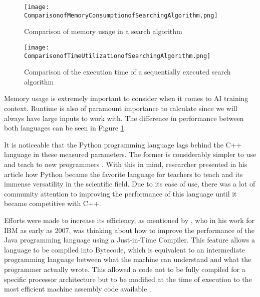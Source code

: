 \begin{figure}[htb]
    \centering
    \begin{minipage}{0.45\linewidth}
        \centering
        \texttt{[image: ComparisonofMemoryConsumptionofSearchingAlgorithm.png]}
        \caption{Comparison of memory usage in a search algorithm\protect\footnotemark}
        \label{fig:comparisonMemorycppvspython}
    \end{minipage}
    \hfill
    \begin{minipage}{0.45\linewidth}
        \centering
        \texttt{[image: ComparisonofTimeUtilizationofSearchingAlgorithm.png]}
        \caption{Comparison of the execution time of a sequentially executed search algorithm\protect\footnotemark}
        \label{fig:speedcppvspython}
    \end{minipage}
\end{figure}




Memory usage is extremely important to consider when it comes to AI training context. Runtime is also of paramount importance to calculate since we will always have large inputs to work with. The difference in performance between both languages can be seen in Figure \ref{fig:speedcppvspython}.


It is noticeable that the Python programming language lags behind the C++ language in these measured parameters. The former is considerably simpler to use and teach to new programmers \cite{C++vsPython}. With this in mind, researcher \citeauthor{HPC_Python} presented in his article  how Python became the favorite language for teachers to teach and its immense versatility in the scientific field. Due to its ease of use, there was a lot of community attention to improving the performance of this language until it became competitive with C++.

Efforts were made to increase its efficiency, as mentioned by \citeauthor{JIT}, who in his work for IBM as early as 2007, was thinking about how to improve the performance of the Java programming language using a Just-in-Time Compiler. This feature allows a language to be compiled into Bytecode, which is equivalent to an intermediate programming language between what the machine can understand and what the programmer actually wrote. This allowed a code not to be fully compiled for a specific processor architecture but to be modified at the time of execution to the most efficient machine assembly code available \cite{JIT}.


